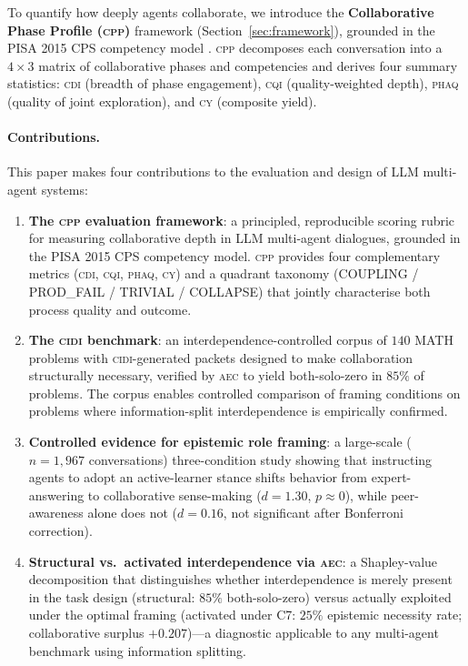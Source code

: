 \documentclass{article}
\newcommand{\CDI}{\textsc{cdi}}
\newcommand{\CQI}{\textsc{cqi}}
\newcommand{\PhAQ}{\textsc{phaq}}
\newcommand{\CY}{\textsc{cy}}
\newcommand{\CPP}{\textsc{cpp}}
\newcommand{\CIDI}{\textsc{cidi}}
\newcommand{\AEC}{\textsc{aec}}
\begin{document}
To quantify how deeply agents collaborate, we introduce the
\textbf{Collaborative Phase Profile (\CPP)} framework
(Section~\ref{sec:framework}), grounded in the PISA 2015 CPS
competency model \citep{pisa2015cps}. \CPP{} decomposes each
conversation into a $4 \times 3$ matrix of collaborative phases and
competencies and derives four summary statistics: \CDI{} (breadth of
phase engagement), \CQI{} (quality-weighted depth), \PhAQ{} (quality
of joint exploration), and \CY{} (composite yield).

\paragraph{Contributions.} This paper makes four contributions to the
evaluation and design of LLM multi-agent systems:
\begin{enumerate}
    \item \textbf{The \CPP{} evaluation framework}: a principled,
    reproducible scoring rubric for measuring collaborative depth in
    LLM multi-agent dialogues, grounded in the PISA 2015 CPS competency
    model. \CPP{} provides four complementary metrics (\CDI, \CQI,
    \PhAQ, \CY) and a quadrant taxonomy (COUPLING / PROD\_FAIL /
    TRIVIAL / COLLAPSE) that jointly characterise both process quality
    and outcome.
    \item \textbf{The \CIDI{} benchmark}: an interdependence-controlled
    corpus of $140$ MATH problems with \CIDI-generated packets designed
    to make collaboration structurally necessary, verified by \AEC{}
    to yield both-solo-zero in $85\%$ of problems. The corpus enables
    controlled comparison of framing conditions on problems where
    information-split interdependence is empirically confirmed.
    \item \textbf{Controlled evidence for epistemic role framing}: a
    large-scale ($n = 1{,}967$ conversations) three-condition study
    showing that instructing agents to adopt an active-learner stance
    shifts behavior from expert-answering to collaborative sense-making
    ($d = 1.30$, $p \approx 0$), while peer-awareness alone does not
    ($d = 0.16$, not significant after Bonferroni correction).
    \item \textbf{Structural vs.\ activated interdependence via \AEC}:
    a Shapley-value decomposition that distinguishes whether
    interdependence is merely present in the task design (structural:
    $85\%$ both-solo-zero) versus actually exploited under the optimal
    framing (activated under C7: $25\%$ epistemic necessity rate;
    collaborative surplus $+0.207$)---a diagnostic applicable to any
    multi-agent benchmark using information splitting.
\end{enumerate}
\end{document}

